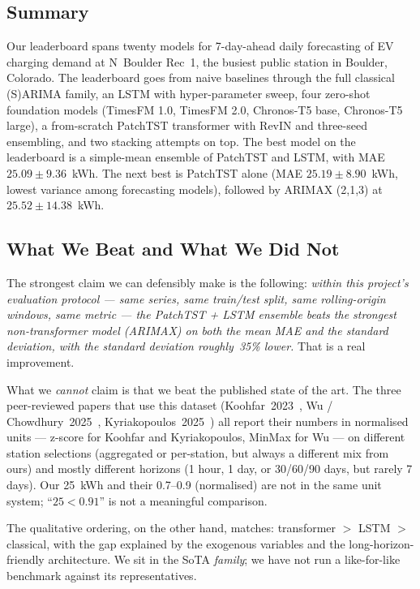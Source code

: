 \subsection{Summary}

Our leaderboard spans twenty models for 7-day-ahead daily forecasting
of EV charging demand at N~Boulder Rec~1, the busiest public station
in Boulder, Colorado. The leaderboard goes from naive baselines through
the full classical (S)ARIMA family, an LSTM with hyper-parameter
sweep, four zero-shot foundation models (TimesFM 1.0, TimesFM 2.0,
Chronos-T5 base, Chronos-T5 large), a from-scratch PatchTST
transformer with RevIN and three-seed ensembling, and two stacking
attempts on top. The best model on the leaderboard is a simple-mean
ensemble of PatchTST and LSTM, with MAE $25.09 \pm 9.36$~kWh. The
next best is PatchTST alone (MAE $25.19 \pm 8.90$~kWh, lowest
variance among forecasting models), followed by ARIMAX (2,1,3) at
$25.52 \pm 14.38$~kWh.

\subsection{What We Beat and What We Did Not}

The strongest claim we can defensibly make is the following:
\emph{within this project's evaluation protocol --- same series, same
train/test split, same rolling-origin windows, same metric --- the
PatchTST + LSTM ensemble beats the strongest non-transformer model
(ARIMAX) on both the mean MAE and the standard deviation, with the
standard deviation roughly~35\% lower.} That is a real improvement.

What we \emph{cannot} claim is that we beat the published state of
the art. The three peer-reviewed papers that use this dataset
(Koohfar~2023~\cite{koohfar2023transformer},
Wu / Chowdhury~2025~\cite{wu2025catformer},
Kyriakopoulos~2025~\cite{kyriakopoulos2025comparative}) all report
their numbers in normalised units --- z-score for Koohfar and
Kyriakopoulos, MinMax for Wu --- on different station selections
(aggregated or per-station, but always a different mix from ours) and
mostly different horizons (1 hour, 1 day, or 30/60/90 days, but rarely
7 days). Our 25~kWh and their 0.7--0.9 (normalised) are not in the
same unit system; ``$25 < 0.91$'' is not a meaningful comparison.

The qualitative ordering, on the other hand, matches: transformer
$>$ LSTM $>$ classical, with the gap explained by the exogenous
variables and the long-horizon-friendly architecture. We sit in the
SoTA \emph{family}; we have not run a like-for-like benchmark against
its representatives.

